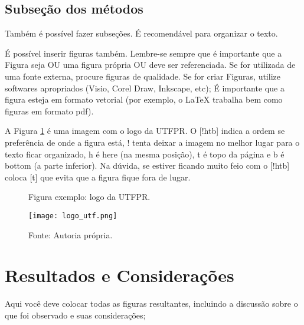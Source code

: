 \documentclass[12pt,a4paper, brazil]{article}
\begin{document}
\subsection{Subseção dos métodos}

Também é possível fazer subseções. É recomendável para organizar o texto.

É possível inserir figuras também. Lembre-se sempre que é importante que a Figura seja OU uma figura própria OU deve ser referenciada. Se for utilizada de uma fonte externa, procure figuras de qualidade. Se for criar Figuras, utilize softwares apropriados (Visio, Corel Draw, Inkscape, etc); É importante que a figura esteja em formato vetorial (por exemplo, o LaTeX trabalha bem como figuras em formato pdf).


\par A Figura \ref{fig:exemplo} é uma imagem com o logo da UTFPR. O [!htb] indica a ordem se preferência de onde a figura está, ! tenta deixar a imagem no melhor lugar para o texto ficar organizado, h é here (na mesma posição), t é topo da página e b é bottom (a parte inferior). Na dúvida, se estiver ficando muito feio com o [!htb] coloca [t] que evita que a figura fique fora de lugar.

\begin{figure}[t]
    \centering
    \caption{Figura exemplo: logo da UTFPR.}
    \texttt{[image: logo\_utf.png]}
    \caption*{Fonte: Autoria própria.} %
    \label{fig:exemplo}
\end{figure}



\section{Resultados e Considerações}

Aqui você deve colocar todas as figuras resultantes, incluindo a discussão sobre o que foi observado e suas considerações; 

\printbibliography
\end{document}

